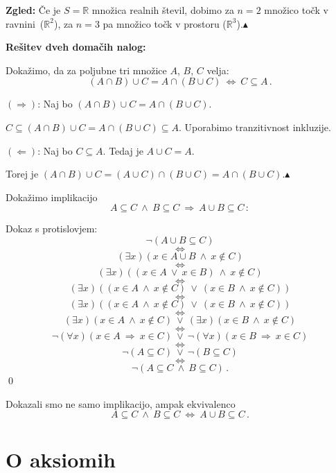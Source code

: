 \documentclass[11pt,paper=b5,footinclude,headinclude]{scrbook} %
\def\ali {{~\vee~}}
\def\inn {{~\wedge~}}
\def\sledi {{~\Rightarrow~}}
\def\cee {{~\Leftrightarrow~}}
\def\zgled{\noindent\textbf{\color{blue} Zgled: }}
\def\kz{{\hfill{\color{blue}$\blacktriangle$}}}%
\begin{document}
\zgled
Če je $S = \mathbb{R}$ množica realnih števil,
dobimo za $n = 2$ množico točk v ravnini~($\mathbb{R}^2$), za
$n = 3$ pa množico točk v prostoru ($\mathbb{R}^3$).\kz

\bigskip

%
%
\bigskip
\textbf{ Rešitev dveh domačih nalog:}

Dokažimo, da za poljubne tri množice $A$, $B$, $C$ velja:
$$(A\cap B)\cup C = A\cap (B\cup C) \cee C\subseteq A\,.$$

\medskip
$(\Rightarrow)$:
Naj bo $(A\cap B)\cup C = A\cap (B\cup C)$.

$C\subseteq (A\cap B)\cup C = A\cap (B\cup C)\subseteq A$. Uporabimo tranzitivnost inkluzije.

\medskip
$(\Leftarrow)$:
Naj bo $C\subseteq A$. Tedaj je $A\cup C = A$.

Torej je
$(A\cap B)\cup C = (A\cup C)\cap (B\cup C) = A\cap (B\cup C)$.\kz

\bigskip
Dokažimo implikacijo
$$A\subseteq C\inn B\subseteq C\sledi A\cup B \subseteq C\,:$$

Dokaz s protislovjem:
$$\neg(A\cup B\subseteq C)$$
$$\cee$$
$$(\exists x)(x\in A\cup B\inn x\not\in C)$$
$$\cee$$
$$(\exists x)((x\in A \ali x\in B)\inn x\not\in C)$$
$$\cee$$
$$(\exists x)((x\in A \inn x\not\in C) \ali (x\in B\inn x\not\in C))$$
$$\cee$$
$$(\exists x)((x\in A \inn x\not\in C) \ali (x\in B\inn x\not\in C))$$
$$\cee$$
$$(\exists x)(x\in A \inn x\not\in C) \ali (\exists x)(x\in B\inn x\not\in C)$$
$$\cee$$
$$\neg(\forall x)(x\in A\sledi x\in C)\ali\neg(\forall x)(x\in B\sledi x\in C)$$
$$\cee$$
$$\neg(A \subseteq C) \ali \neg(B\subseteq C)$$
$$\cee$$
$$\neg(A \subseteq C \inn B\subseteq C)\,.$$
\qed

Dokazali smo ne samo implikacijo, ampak ekvivalenco
$$A\subseteq C\inn B\subseteq C\cee A\cup B \subseteq C\,.$$


\section{O aksiomih}
\end{document}

